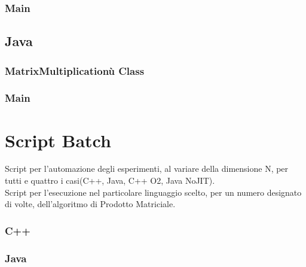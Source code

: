 \subsubsection{Main}


\subsection{Java}
\subsubsection{MatrixMultiplicationù Class}

\subsubsection{Main}


\clearpage

\section{Script Batch}
Script per l'automazione degli esperimenti, al variare della
dimensione N, per tutti e quattro i casi(C++, Java, C++ O2, Java NoJIT).\\


\clearpage
Script per l'esecuzione nel particolare linguaggio scelto, per un numero
designato di volte, dell'algoritmo di Prodotto Matriciale.\\
\subsubsection{C++}

\subsubsection{Java}

